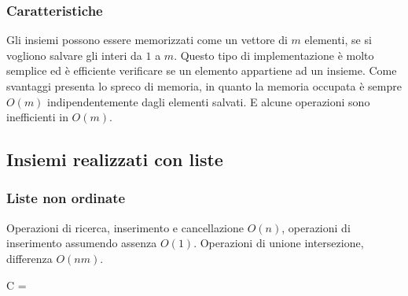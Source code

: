 \subsubsection{Caratteristiche}
Gli insiemi possono essere memorizzati come un vettore di $m$ elementi, se si vogliono salvare gli interi da $1$ a $m$. Questo tipo di implementazione \`e
molto semplice ed \`e efficiente verificare se un elemento appartiene ad un insieme. Come svantaggi presenta lo spreco di memoria, in quanto la memoria
occupata \`e sempre $O(m)$ indipendentemente dagli elementi salvati. E alcune operazioni sono inefficienti in $O(m)$. 
\subsection{Insiemi realizzati con liste}
\subsubsection{Liste non ordinate}
Operazioni di ricerca, inserimento e cancellazione $O(n)$, operazioni di inserimento assumendo assenza $O(1)$. Operazioni di unione intersezione, differenza
$O(nm)$.
\begin{algorithm}
\DontPrintSemicolon
{}

\caption{\protect\Set \protect{}}

\Set C = \Set{}\;
\end{algorithm}
